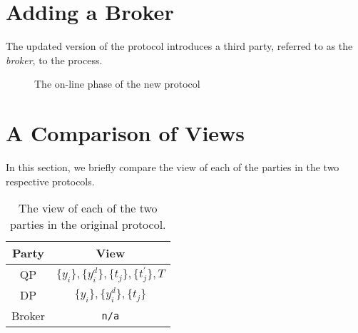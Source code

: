 \documentclass[oribibl]{llncs}
\begin{document}
\clearpage

\FloatBarrier
\section*{Adding a Broker}
\FloatBarrier

The updated version of the protocol introduces a third party, referred to as the \emph{broker}, to the process. 
\begin{figure}[htb!]
	\centering
	\caption{The on-line phase of the new protocol}
\end{figure}

\section*{A Comparison of Views}

In this section, we briefly compare the view of each of the parties in the two respective protocols. 


\begin{table}[htb!]
	\centering
	\begin{tabular}{c|c} 
	Party	& View  \\ \hline
	QP	&  \( \{y_i\},  \{y_{i}^d\}, \{ t_j\}, \{ t_{j}^{\prime} \}, T \)  \\
	DP	& \( \{y_i\},  \{y_{i}^d\}, \{ t_j\} \)    \\ 
	Broker	& \texttt{n/a} \\
	\end{tabular}
	\vspace{0.25cm}
	\caption{The view of each of the two parties in the original protocol.}
\end{table}
\end{document}
